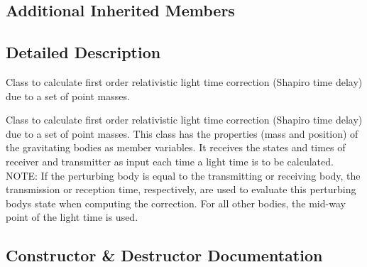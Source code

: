 \subsection*{Additional Inherited Members}


\subsection{Detailed Description}
Class to calculate first order relativistic light time correction (Shapiro time delay) due to a set of point masses. 

Class to calculate first order relativistic light time correction (Shapiro time delay) due to a set of point masses. This class has the properties (mass and position) of the gravitating bodies as member variables. It receives the states and times of receiver and transmitter as input each time a light time is to be calculated. N\+O\+TE\+: If the perturbing body is equal to the transmitting or receiving body, the transmission or reception time, respectively, are used to evaluate this perturbing body\textquotesingle{}s state when computing the correction. For all other bodies, the mid-\/way point of the light time is used. 

\subsection{Constructor \& Destructor Documentation}

